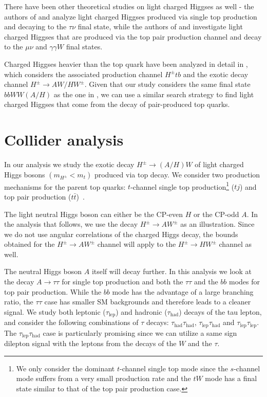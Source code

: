 There have been other theoretical studies on light charged Higgses as well - the authors of \cite{Guedes:2012eu} and \cite{Hashemi:2013kga} analyze light charged Higgses produced via single top production and decaying to the $\tau\nu$ final state, while the authors of \cite{Hashemi:2011gy} and \cite{Das:2014fha} investigate light charged Higgses that are produced via the top pair production channel and decay to the $\mu\nu$ and $\gamma\gamma W$ final states.

Charged Higgses heavier than the top quark have been analyzed in detail in \cite{Coleppa:2014cca}, which considers the associated production channel $H^{\pm} tb$ and the exotic decay channel $H^{\pm}\rightarrow AW/HW^{\pm}$. Given that our study considers the same final state $bbWW(A/H)$ as the one in \cite{Coleppa:2014cca}, we can use a similar search strategy to find light charged Higgses that come from the decay of pair-produced top quarks.

\section{Collider analysis}\label{sec:light_charged_analysis}

In our analysis we study the exotic decay $H^{\pm} \rightarrow (A/H)W$ of light charged Higgs bosons $(m_{H^{\pm}}<m_t)$ produced via top decay. We consider two production mechanisms for the parent top quarks: $t$-channel single top production\footnote{We only consider the dominant $t$-channel single top mode since the $s$-channel mode suffers from a very small production rate and the $tW$ mode has a final state similar to that of the top pair production case.} ($tj$) and top pair production ($t\bar{t}$)~\cite{Kidonakis:2012db}.

The light neutral Higgs boson can either be the CP-even $H$ or the CP-odd $A$. In the analysis that follows, we use the decay $H^{\pm} \rightarrow A W^{\pm}$ as an illustration. Since we do not use angular correlations of the charged Higgs decay, the bounds obtained for the $H^{\pm} \rightarrow A W^{\pm}$ channel will apply to the $H^{\pm} \rightarrow H W^{\pm}$ channel as well.

The neutral Higgs boson $A$ itself will decay further. In this analysis we look at the decay $A \rightarrow\tau\tau$ for single top production and both the $\tau\tau$ and the $bb$ modes for top pair production. While the $bb$ mode has the advantage of a large branching ratio, the $\tau\tau$ case has smaller SM backgrounds and therefore leads to a cleaner signal. We study both leptonic ($\tau_\text{lep}$) and hadronic ($\tau_\text{had}$) decays of the tau lepton, and consider the following combinations of $\tau$ decays: $\tau_\text{had}\tau_\text{had}$, $\tau_\text{lep}\tau_\text{had}$ and $\tau_\text{lep}\tau_\text{lep}$. The $\tau_\text{lep}\tau_\text{had}$ case is particularly promising since we can utilize a same sign dilepton signal with the leptons from the decays of the $W$ and the $\tau$. 

